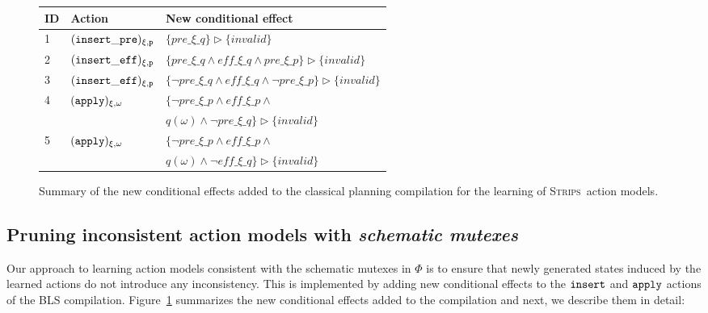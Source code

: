 \documentclass{article}
\newcommand{\strips}{\textsc{Strips}}
\begin{document}
\begin{figure}
	\begin{footnotesize}
		\begin{tabular}{lll}
			{\bf ID} & {\bf Action} & {\bf New conditional effect}\\\hline
			1&${\tt (insert\_pre)_{\xi,p}}$&$\{pre\_\xi\_q\}\rhd\{invalid\}$\\
			2&${\tt (insert\_eff)_{\xi,p}}$&$\{pre\_\xi\_q\wedge eff\_\xi\_q\wedge pre\_\xi\_p\}\rhd\{invalid\}$\\
			3&${\tt (insert\_eff)_{\xi,p}}$&$\{\neg pre\_\xi\_q\wedge eff\_\xi\_q\wedge \neg pre\_\xi\_p\}\rhd\{invalid\}$\\
			4&${\tt (apply)_{\xi,\omega}}$&$\{\neg pre\_\xi\_p \wedge eff\_\xi\_p \wedge $\\
			&&$q(\omega)\wedge \neg pre\_\xi\_q\}\rhd\{invalid\}$\\
			5&${\tt (apply)_{\xi,\omega}}$&$\{\neg pre\_\xi\_p \wedge eff\_\xi\_p \wedge $\\
			&&$q(\omega)\wedge \neg eff\_\xi\_q\}\rhd\{invalid\}$
		\end{tabular}
	\end{footnotesize}
	\caption{\small Summary of the new conditional effects added to the classical planning compilation for the learning of \strips\ action models.}
	\label{fig:ceffects}
\end{figure}

\subsection{Pruning inconsistent action models with {\em schematic mutexes}}


Our approach to learning action models consistent with the schematic mutexes in $\Phi$ is to ensure that newly generated states induced by the learned actions do not introduce any inconsistency. This is implemented by adding new conditional effects to the ${\tt \small insert}$ and ${\tt\small apply}$ actions of the BLS compilation. Figure~\ref{fig:ceffects} summarizes the new conditional effects added to the compilation and next, we describe them in detail:
\end{document}
